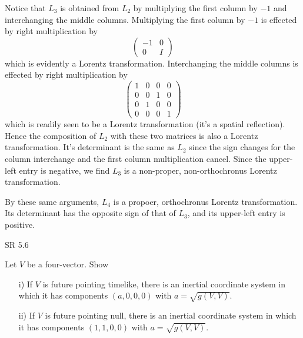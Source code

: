 \documentclass[minion]{homework}
\begin{document}
\begin{aproblems}
Notice that $L_3$ is obtained from $L_2$ by multiplying the first column
by $-1$ and interchanging the middle columns.  Multiplying the first column
by $-1$ is effected by right multiplication by
\[
\begin{pmatrix} -1 & 0 \\
0 &I\end{pmatrix}
\]
which is evidently a Lorentz transformation. Interchanging the middle columns
is effected by right multiplication by
\[
\begin{pmatrix} 
1 &0& 0& 0\\
0 &0& 1& 0\\
0 &1& 0& 0\\
0 &0& 0& 1\end{pmatrix}
\]
which is readily seen to be a Lorentz transformation (it's a spatial reflection).  Hence the composition of $L_2$ with these two matrices
is also a Lorentz transformation.  It's determinant is the same as $L_2$
since the sign changes for the column interchange and the first column
multiplication cancel. Since the upper-left entry is negative, we find
$L_3$ is a non-proper, non-orthochronus Lorentz transformation.

By these same arguments, $L_4$ is a propoer, orthochronus Lorentz transformation.  Its determinant has the opposite sign of that of $L_3$,
and its upper-left entry is positive.

\hproblem SR 5.6

Let $V$ be a four-vector.  Show
\begin{itemize}
\item[i)] If $V$ is future pointing timelike, there is an inertial coordinate
system in which it has components $(a,0,0,0)$ with $a=\sqrt{g(V,V)}$.
\item[ii)] If $V$ is future pointing null, there is an inertial coordinate
system in which it has components $(1,1,0,0)$ with $a=\sqrt{g(V,V)}$.
\end{itemize}
\solution


\end{aproblems}
\end{document}
